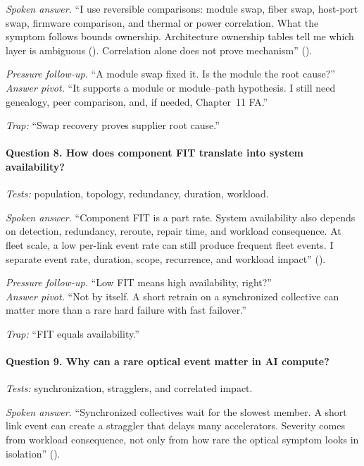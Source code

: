 \textit{Spoken answer.}
``I use reversible comparisons: module swap, fiber swap, host-port swap,
firmware comparison, and thermal or power correlation. What the symptom follows
bounds ownership. Architecture ownership tables tell me which layer is
ambiguous (). Correlation alone does not prove
mechanism'' ().

\textit{Pressure follow-up.} ``A module swap fixed it. Is the module the root
cause?''\\
\textit{Answer pivot.} ``It supports a module or module--path hypothesis. I
still need genealogy, peer comparison, and, if needed, Chapter~11 FA.''

\textit{Trap:} ``Swap recovery proves supplier root cause.''

\paragraph{Question 8. How does component FIT translate into system
availability?}
\textit{Tests:} population, topology, redundancy, duration, workload.

\textit{Spoken answer.}
``Component FIT is a part rate. System availability also depends on detection,
redundancy, reroute, repair time, and workload consequence. At fleet scale, a
low per-link event rate can still produce frequent fleet events. I separate
event rate, duration, scope, recurrence, and workload impact''
().

\textit{Pressure follow-up.} ``Low FIT means high availability, right?''\\
\textit{Answer pivot.} ``Not by itself. A short retrain on a synchronized
collective can matter more than a rare hard failure with fast failover.''

\textit{Trap:} ``FIT equals availability.''

\paragraph{Question 9. Why can a rare optical event matter in AI compute?}
\textit{Tests:} synchronization, stragglers, and correlated impact.

\textit{Spoken answer.}
``Synchronized collectives wait for the slowest member. A short link event can
create a straggler that delays many accelerators. Severity comes from workload
consequence, not only from how rare the optical symptom looks in isolation''
().

